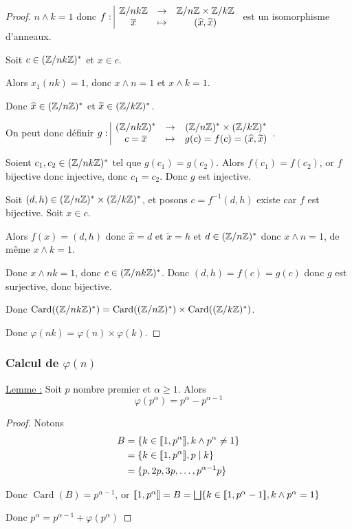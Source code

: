 \begin{proof}
    $n \wedge k = 1$ donc $f: \space \begin{array}{|ccc} \displaystyle \mathbb{Z}/nk\mathbb{Z} & \to & \displaystyle \mathbb{Z}/n\mathbb{Z} \times \mathbb{Z}/k\mathbb{Z} \\ \displaystyle \overline x & \mapsto & \displaystyle (\widehat x, \widetilde x) \end{array}$ est un isomorphisme d'anneaux.

    Soit $c \in (\mathbb{Z}/nk\mathbb{Z})^*$ et $x \in c$. 

    Alors $x_1(nk) = 1$, donc $x \wedge n = 1$ et $x \wedge k = 1$.

    Donc $\widehat x  \in (\mathbb{Z}/n\mathbb{Z})^*$ et $\widetilde x \in (\mathbb{Z}/k\mathbb{Z})^*$.

    On peut donc définir $g: \space \begin{array}{|ccc} \displaystyle (\mathbb{Z}/nk\mathbb{Z})^* & \to & \displaystyle (\mathbb{Z}/n\mathbb{Z})^* \times (\mathbb{Z}/k\mathbb{Z})^* \\ \displaystyle c = \overline x & \mapsto & \displaystyle g(c) = f(c) = (\widehat x, \widetilde x) \end{array}$.

    Soient $c_1, c_2 \in (\mathbb{Z}/nk\mathbb{Z})^*$ tel que $g(c_1) = g(c_2)$. Alors 
    $f(c_1) = f(c_2)$, or $f$ bijective donc injective, donc $c_1 = c_2$. Donc $g$ est injective.

    Soit $(d, h) \in (\mathbb{Z}/n\mathbb{Z})^* \times (\mathbb{Z}/k\mathbb{Z})^*$, et posons $c = f^{-1}(d, h)$ existe car $f$ 
    est bijective. Soit $x \in c$.

    Alors $f(x) = (d, h)$ donc $\widehat x = d $ et $\widetilde x = h$ et 
    $d \in (\mathbb{Z}/n\mathbb{Z})^*$ donc $x \wedge n = 1$, de même $x \wedge k = 1$.

    Donc $x \wedge nk = 1$, donc $c \in (\mathbb{Z}/nk\mathbb{Z})^*$. Donc $(d, h) = f(c) = g(c)$ donc 
    $g$ est surjective, donc bijective.

    Donc $\operatorname{Card}((\mathbb{Z}/nk\mathbb{Z})^*) = \operatorname{Card}((\mathbb{Z}/n\mathbb{Z})^*) \times \operatorname{Card}((\mathbb{Z}/k\mathbb{Z})^*)$.

    Donc $\varphi(nk) = \varphi(n) \times \varphi(k)$.
\end{proof}

\subsubsection{Calcul de $\varphi(n)$}

\uline{Lemme :} Soit $p$ nombre premier et $\alpha \geqslant 1$. Alors 
\[
    \varphi(p^\alpha) = p^\alpha - p^{\alpha - 1} 
\]

\begin{proof}
    Notons 
    \begin{align*}
        B & = \{k \in [\![1, p^\alpha]\!], k \wedge p^\alpha \neq 1\} \\
        & = \{k \in [\![1, p^\alpha]\!], p \mid k\} \\
        & = \{p, 2p, 3p, \ldots, p^{\alpha - 1} p\} \\
    \end{align*} 

    Donc $\operatorname{Card}(B) = p^{\alpha - 1}$, or $[\![1, p^\alpha]\!] = B = \bigsqcup \{k \in [\![1, p^\alpha - 1]\!], k \wedge p^\alpha = 1\}$
    
    Donc $p^\alpha = p^{\alpha - 1} + \varphi(p^\alpha)$
\end{proof}


